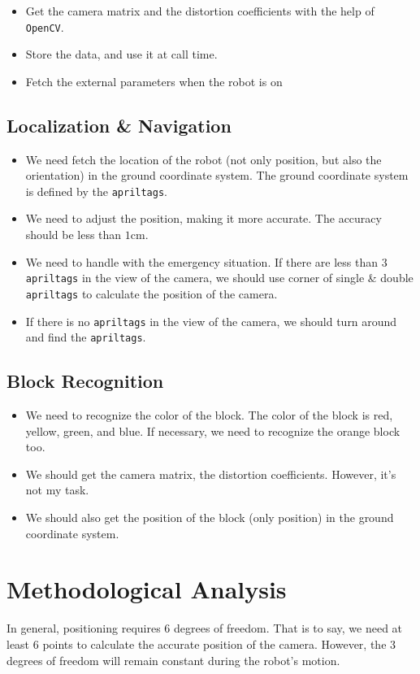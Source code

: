 \documentclass{article}
\begin{document}
\begin{itemize}
  \item Get the camera matrix and the distortion coefficients with the help of \texttt{OpenCV}.
  \item Store the data, and use it at call time.
  \item Fetch the external parameters when the robot is on
\end{itemize}

\subsection{Localization \& Navigation}

\begin{itemize}
  \item We need fetch the location of the robot (not only position, but also the orientation) in the ground coordinate system. The ground coordinate system is defined by the \texttt{apriltags}.
  \item We need to adjust the position, making it more accurate. The accuracy should be less than $1\mathrm{cm}$.
  \item We need to handle with the emergency situation. If there are less than $3$ \texttt{apriltags} in the view of the camera, we should use corner of single \& double \texttt{apriltags} to calculate the position of the camera.
  \item If there is no \texttt{apriltags} in the view of the camera, we should turn around and find the \texttt{apriltags}.
\end{itemize}

\subsection{Block Recognition}

\begin{itemize}
  \item We need to recognize the color of the block. The color of the block is red, yellow, green, and blue. If necessary, we need to recognize the orange block too.
  \item We should get the camera matrix, the distortion coefficients. However, it's not my task.
  \item We should also get the position of the block (only position) in the ground coordinate system.
\end{itemize}

\section{Methodological Analysis}
In general, positioning requires $6$ degrees of freedom. That is to say, we need at least $6$ points to calculate the accurate position of the camera. However, the $3$ degrees of freedom will remain constant during the robot's motion.
\end{document}
